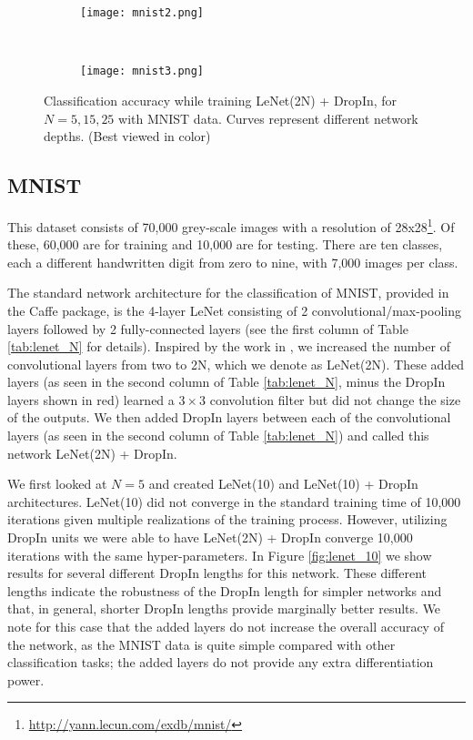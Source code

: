 \documentclass[10pt,twocolumn,letterpaper]{article}
\newcommand{\dropin}{DropIn }
\newcommand{\dropinNS}{DropIn}
\begin{document}
\begin{figure}[tbh]
\begin{center}
\begin{subfigure}[b]{0.5\textwidth}
        \texttt{[image: mnist2.png]}
    \end{subfigure}\\
    \begin{subfigure}[b]{0.5\textwidth}
        \texttt{[image: mnist3.png]}
    \end{subfigure}
\end{center}
 \vspace{-10pt}
   \caption{Classification accuracy while training LeNet(2N) + \dropinNS, for $N=5,15,25$ with MNIST data. Curves represent different network depths. (Best viewed in color)  
}
\label{fig:lenet_droplens}
  \vspace{-10pt}
\end{figure}



\subsection{MNIST} \label{sec:mnist}
This dataset consists of 70,000 grey-scale images with a resolution of 28x28\footnote{\url{http://yann.lecun.com/exdb/mnist/}}.  
Of these, 60,000 are for training and 10,000 are for testing.  
There are ten classes, each a different handwritten digit from zero to nine, with 7,000 images per class.  

The standard network architecture for the classification of MNIST, provided in the Caffe package, is the 4-layer LeNet consisting of 2 convolutional/max-pooling layers followed by 2 fully-connected layers (see the first column of Table \ref{tab:lenet_N} for details).  
Inspired by the work in \cite{srivastava2015training}, we increased the number of convolutional layers from two to 2N, which we denote as LeNet(2N).  
These added layers (as seen in the second column of Table \ref{tab:lenet_N}, minus the \dropin layers shown in red) learned a $3\times 3$ convolution filter but did not change the size of the outputs.  
We then added \dropin layers between each of the convolutional layers (as seen in the second column of Table \ref{tab:lenet_N}) and called this network LeNet(2N) + \dropinNS.

We first looked at $N=5$ and created LeNet(10) and LeNet(10) + \dropin architectures.   LeNet(10) did not converge in the standard training time of 10,000 iterations given multiple realizations of the training process.  
However, utilizing \dropin units we were able to have LeNet(2N) + \dropin  converge 10,000 iterations with the same hyper-parameters.  
In Figure \ref{fig:lenet_10} we show results for several different \dropin lengths for this network.  These different lengths indicate the robustness of the \dropin length for simpler networks and that, in general, shorter \dropin lengths provide marginally better results.
We note for this case that the added layers do not increase the overall accuracy of the network, as the MNIST data is quite simple compared with other classification tasks; the added layers do not provide any extra differentiation power.  
\end{document}

